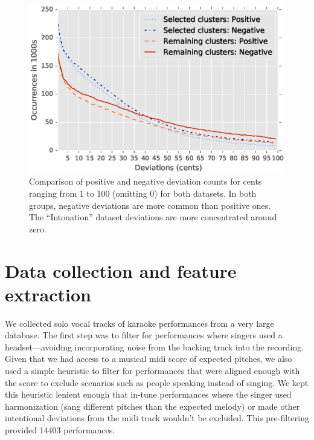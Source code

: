 \begin{figure}[h!]
    \centering
    \includegraphics[width=12cm]{figures/full_pos_vs_neg_line.eps}
    \caption{Comparison of positive and negative deviation counts for cents ranging from 1 to 100 (omitting 0) for both datasets. In both groups, negative deviations are more common than positive ones. The ``Intonation'' dataset deviations are more concentrated around zero. }
    \label{fig:pos_neg}
\end{figure}

\section{Data collection and feature extraction}
\label{sec:features}
We collected solo vocal tracks of karaoke performances from a very large database. The first step was to filter for performances where singers used a headset---avoiding incorporating noise from the backing track into the recording. Given that we had access to a musical \gls{midi} score of expected pitches, we also used a simple heuristic to filter for performances that were aligned enough with the score to exclude scenarios such as people speaking instead of singing. We kept this heuristic lenient enough that in-tune performances where the singer used harmonization (sang different pitches than the expected melody) or made other intentional deviations from the \gls{midi} track wouldn't be excluded. This pre-filtering provided 14403 performances. 

